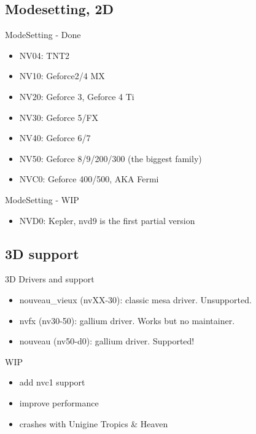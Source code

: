 \documentclass[11pt,english,compress]{beamer}
\begin{document}
	\subsection{Modesetting, 2D}
		\begin{frame}
			\begin{block}{ModeSetting - Done}
				\begin{itemize}
					\item NV04: TNT2
					\item NV10: Geforce2/4 MX
					\item NV20: Geforce 3, Geforce 4 Ti
					\item NV30: Geforce 5/FX
					\item NV40: Geforce 6/7
					\item NV50: Geforce 8/9/200/300 (the biggest family)
					\item NVC0: Geforce 400/500, AKA Fermi
				\end{itemize}
			\end{block}

			\begin{block}{ModeSetting - WIP}
				\begin{itemize}
					\item NVD0: Kepler, nvd9 is the first partial version
				\end{itemize}
			\end{block}
		\end{frame}

	\subsection{3D support}
		\begin{frame}
			\begin{block}{3D Drivers and support}
				\begin{itemize}
					\item nouveau\_vieux (nvXX-30): classic mesa driver. Unsupported.
					\item nvfx (nv30-50): gallium driver. Works but no maintainer.
					\item nouveau (nv50-d0): gallium driver. Supported! 
				\end{itemize}
			\end{block}
	
			\begin{block}{WIP}
				\begin{itemize}
					\item add nvc1 support
					\item improve performance
					\item crashes with Unigine Tropics \& Heaven
				\end{itemize}
			\end{block}
		\end{frame}
\end{document}
